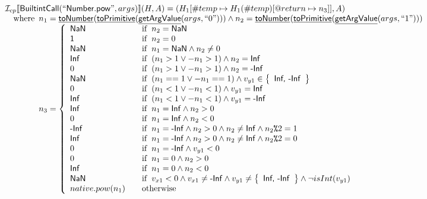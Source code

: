 \documentclass{article}
\newcommand{\SF}[1]{\mbox{\textsf{#1}}}
\newcommand{\TT}[1]{\mbox{\texttt{#1}}}
\newcommand{\wherec}[1]{{\rm where}\begin{array}[t]{l}#1\end{array}}
\newcommand{\ifc}[1]{{\rm if}\begin{array}[t]{l}#1\end{array}}
\newcommand{\owc}{{\rm otherwise}}
\newcommand{\I}{\mathcal{I}}
\newcommand{\set}[1]{\left\{\begin{array}{l}#1\end{array}\right\}}
\newcommand{\lbr}{\llbracket}
\newcommand{\rbr}{\rrbracket}
\newcommand{\hf}[1]{\underline{\sf #1}}
\begin{document}
\[
\begin{array}{l}

\I _{cp}\lbr \SF{BuiltintCall}(``\SF{Number.pow}",args)\rbr(H,A)
  = (H_1[\#temp \mapsto H_1(\#temp)[@return \mapsto n_3]], A)\\
\quad\wherec{
  n_1 = \hf{toNumber}(\hf{toPrimitive}(\hf{getArgValue}(args, ``0")))
  \land n_2 = \hf{toNumber}(\hf{toPrimitive}(\hf{getArgValue}(args, ``1")))\\
  n_3 = \left\{
    \begin{array}{l@{\quad\quad}l}
      \SF{NaN} & \ifc{n_2 =\SF{NaN}}\\
      \SF{1}   & \ifc{n_2 =0}\\
      \SF{NaN} & \ifc{n_1=\SF{NaN} \land n_2 \neq0}\\
      \SF{Inf} & \ifc{(n_1 > 1 \lor -n_1 > 1) \land n_2 =\SF{Inf}}\\
      0        & \ifc{(n_1 > 1 \lor -n_1 > 1) \land n_2 =\SF{-Inf}}\\
      \SF{NaN} & \ifc{(n_1 == 1 \lor -n_1 == 1) \land v_{y1}\in\set{\SF{Inf, -Inf}}}\\
      0        & \ifc{(n_1 < 1 \lor -n_1 < 1) \land v_{y1}=\SF{Inf}}\\
      \SF{Inf} & \ifc{(n_1 < 1 \lor -n_1 < 1) \land v_{y1}=\SF{-Inf}}\\
      \SF{Inf} & \ifc{n_1=\SF{Inf} \land n_2>0}\\
      0        & \ifc{n_1=\SF{Inf} \land n_2<0}\\
      \SF{-Inf} & \ifc{n_1=\SF{-Inf} \land n_2 > 0 \land n_2 \neq \SF{Inf} \land n_2 \TT{\%} 2 = 1}\\
      \SF{Inf} & \ifc{n_1=\SF{-Inf} \land n_2 > 0 \land n_2 \neq \SF{Inf}  \land  n_2 \TT{\%} 2 = 0}\\
      0        & \ifc{n_1=\SF{-Inf} \land v_{y1}<0}\\
      0        & \ifc{n_1 =0 \land n_2 >0}\\
      \SF{Inf} & \ifc{n_1 =0 \land n_2 <0}\\

      \SF{NaN} & \ifc{v_{x1}<0 \land v_{x1}\neq\SF{-Inf} \land v_{y1}\neq\set{\SF{Inf, -Inf}} \land \neg isInt(v_{y1})}\\
      native.pow(n_1) & \owc 
    \end{array}
  \right.
  }\\
\\\\




\end{array}\]
\end{document}
